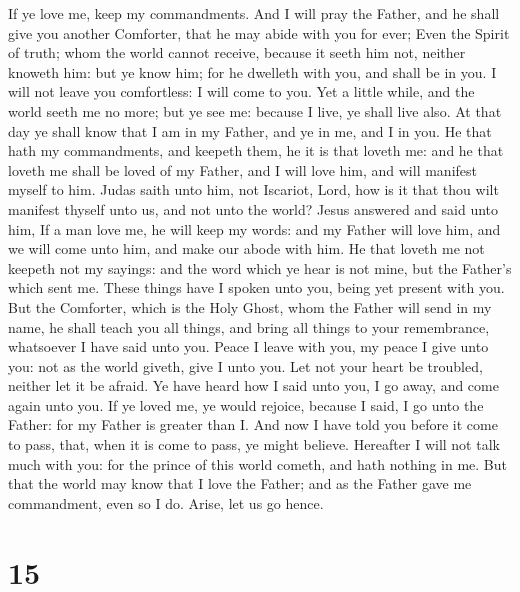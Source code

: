 If ye love me, keep my commandments.  And
I will pray the Father, and he shall give you another Comforter, that he
may abide with you for ever;  Even the Spirit of truth;
whom the world cannot receive, because it seeth him not, neither knoweth
him: but ye know him; for he dwelleth with you, and shall be in you.
 I will not leave you comfortless: I will come to you.
 Yet a little while, and the world seeth me no more; but
ye see me: because I live, ye shall live also.  At that
day ye shall know that I am in my Father, and ye in me, and I in you.
 He that hath my commandments, and keepeth them, he it is
that loveth me: and he that loveth me shall be loved of my Father, and I
will love him, and will manifest myself to him.  Judas
saith unto him, not Iscariot, Lord, how is it that thou wilt manifest
thyself unto us, and not unto the world?  Jesus answered
and said unto him, If a man love me, he will keep my words: and my
Father will love him, and we will come unto him, and make our abode with
him.  He that loveth me not keepeth not my sayings: and
the word which ye hear is not mine, but the Father's which sent me.
 These things have I spoken unto you, being yet present
with you.  But the Comforter, which is the Holy Ghost,
whom the Father will send in my name, he shall teach you all things, and
bring all things to your remembrance, whatsoever I have said unto you.
 Peace I leave with you, my peace I give unto you: not as
the world giveth, give I unto you. Let not your heart be troubled,
neither let it be afraid.  Ye have heard how I said unto
you, I go away, and come again unto you. If ye loved me, ye would
rejoice, because I said, I go unto the Father: for my Father is greater
than I.  And now I have told you before it come to pass,
that, when it is come to pass, ye might believe. 
Hereafter I will not talk much with you: for the prince of this world
cometh, and hath nothing in me.  But that the world may
know that I love the Father; and as the Father gave me commandment, even
so I do. Arise, let us go hence.

\hypertarget{section-14}{%
\section{15}\label{section-14}}

